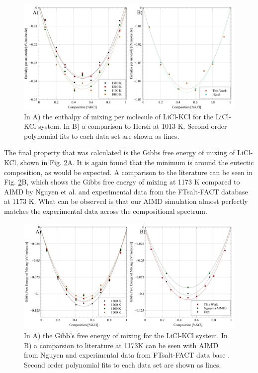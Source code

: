 \documentclass[review]{elsarticle}
\providecommand{\DIFaddbeginFL}{} %
\providecommand{\DIFaddendFL}{} %
\providecommand{\DIFdelbeginFL}{} %
\providecommand{\DIFdelendFL}{} %
\newcommand{\DIFscaledelfig}{0.5}
\newlength{\DIFdelgraphicswidth} %
\newlength{\DIFdelgraphicsheight} %
\newcommand{\DIFaddincludegraphics}[2][]{{\color{blue}\fbox{\DIFOincludegraphics[#1]{#2}}}} %
\newcommand{\DIFdelincludegraphics}[2][]{%
\sbox{\DIFdelgraphicsbox}{\DIFOincludegraphics[#1]{#2}}%
\settoboxwidth{\DIFdelgraphicswidth}{\DIFdelgraphicsbox} %
\settoboxtotalheight{\DIFdelgraphicsheight}{\DIFdelgraphicsbox} %
\scalebox{\DIFscaledelfig}{%
\parbox[b]{\DIFdelgraphicswidth}{\usebox{\DIFdelgraphicsbox}\\[-\baselineskip] \rule{\DIFdelgraphicswidth}{0em}}\llap{\resizebox{\DIFdelgraphicswidth}{\DIFdelgraphicsheight}{%
\setlength{\unitlength}{\DIFdelgraphicswidth}%
\begin{picture}(1,1)%
\thicklines\linethickness{2pt} %
{\color[rgb]{1,0,0}\put(0,0){\framebox(1,1){}}}%
{\color[rgb]{1,0,0}\put(0,0){\line( 1,1){1}}}%
{\color[rgb]{1,0,0}\put(0,1){\line(1,-1){1}}}%
\end{picture}%
}\hspace*{3pt}}} %
} %
\DeclareRobustCommand{\DIFaddbeginFL}{\DIFOaddbeginFL \let\includegraphics\DIFaddincludegraphics} %
\DeclareRobustCommand{\DIFaddendFL}{\DIFOaddendFL \let\includegraphics\DIFOincludegraphics} %
\DeclareRobustCommand{\DIFdelbeginFL}{\DIFOdelbeginFL \let\includegraphics\DIFdelincludegraphics} %
\DeclareRobustCommand{\DIFdelendFL}{\DIFOaddendFL \let\includegraphics\DIFOincludegraphics} %
\begin{document}
\begin{figure}[h]
 \centering
 \DIFdelbeginFL %
\DIFdelendFL \DIFaddbeginFL \includegraphics[width=1.0\textwidth]{images/enthalpy_combined.jpg} 
 \DIFaddendFL \caption{In A) the enthalpy of mixing per molecule of LiCl-KCl for the LiCl-KCl system. In B)  a comparison to Hersh \cite{hersh1965enthalpies} at 1013 K. Second order polynomial fits to each data set are shown as lines.}
 \label{fig:enthalpy}
\end{figure} 

The final property that was calculated is the Gibbs free energy of mixing of LiCl-KCl, shown in Fig. \ref{fig:gibb}A. It is again found that the minimum is around the eutectic composition, as would be expected. A comparison to the literature can be seen in Fig. \ref{fig:gibb}B, which shows the Gibbs free energy of mixing at 1173 K compared to AIMD by Nguyen et al. \cite{NGUYEN2021} and experimental data from the FTsalt-FACT database \cite{FTsalt} at 1173 K. What can be observed is that our AIMD simulation almost perfectly matches the experimental data across the compositional spectrum.

\begin{figure}[h]
 \centering
 \DIFdelbeginFL %
\DIFdelendFL \DIFaddbeginFL \includegraphics[width=1.0\textwidth]{images/gibbs_mixxing_combined.jpg} 
 \DIFaddendFL \caption{In A) the Gibb's free energy of mixing for the LiCl-KCl system. In B) a comparsion to literature at 1173K can be seen with AIMD from Nguyen \cite{NGUYEN2021} and experimental data from FTsalt-FACT data base \cite{FTsalt}. Second order polynomial fits to each data set are shown as lines.}
 \label{fig:gibb}
\end{figure} 
\end{document}
